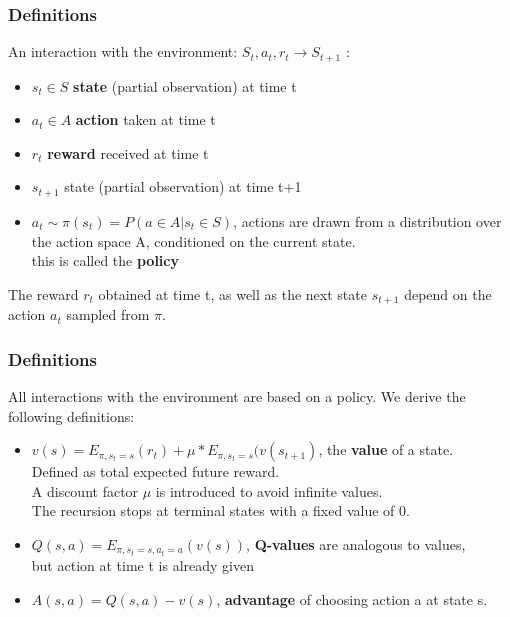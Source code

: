 \documentclass{beamer}
\begin{document}
\begin{frame}
\frametitle{Definitions}
An interaction with the environment: \(S_t, a_t, r_t \rightarrow S_{t+1}\) :
\begin{itemize}
\item \(s_t \in S\) \textbf{state} (partial observation) at time t
\item \(a_t \in A\) \textbf{action} taken at time t
\item \(r_t\) \textbf{reward} received at time t
\item \(s_{t+1}\) state (partial observation) at time t+1
\item \(a_t \sim \pi(s_t) = P(a \in A | s_t \in S)\), actions are drawn from a distribution over the action space A, conditioned on the current state.\\
this is called the \textbf{policy}
\end{itemize}
\bigskip
The reward \(r_t\) obtained at time t, as well as the next state \(s_{t+1}\) depend on the action \(a_t\) sampled from \(\pi\).
\end{frame}

\begin{frame}
\frametitle{Definitions}
All interactions with the environment are based on a policy. We derive the following definitions:
\begin{itemize}
\item \(v(s) = E_{\pi, s_t = s}(r_t) + \mu * E_{\pi, s_t = s}(v(s_{t+1})\), the \textbf{value} of a state.\\
Defined as total expected future reward.\\
A discount factor \(\mu\) is introduced to avoid infinite values.\\
The recursion stops at terminal states with a fixed value of 0.
\item \(Q(s, a) = E_{\pi, s_t = s, a_t= a} (v(s))\), \textbf{Q-values} are analogous to values, \\
but action at time t is already given
\item \(A(s, a) = Q(s, a) - v(s)\), \textbf{advantage} of choosing action a at state s.
\end{itemize}
\end{frame}
\end{document}
